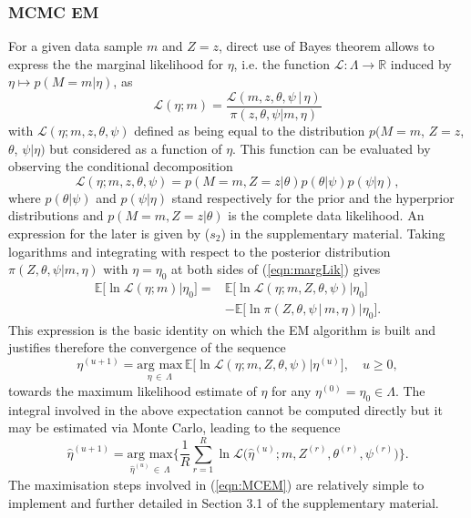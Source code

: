 \documentclass{bioinfo}
\begin{document}
\subsubsection{MCMC EM}\label{sec:MCMCEM}
For a given data sample $m$ and $Z = z$, direct use of Bayes theorem 
allows to  express the the marginal likelihood for $\eta$, i.e. the
function $\mathcal L: \Lambda \to \mathbb R$ induced by $\eta 
\mapsto p(M=m|\eta)$, as
\begin{equation}
  \label{eqn:margLik}
  \mathcal L(\eta; m) 
  = \frac{\mathcal L(m, z, \theta, \psi\,|\,\eta)}{\pi(z,
      \theta, \psi|m, \eta)}
\end{equation}
with $\mathcal L(\eta; m, z, \theta, \psi)$ 
defined as being equal to the distribution $p(M=m$, $Z=z$, $\theta$,
$\psi|\eta)$ but considered as a function of $\eta$.  This function
can be evaluated by observing the conditional decomposition
\[
   \mathcal L(\eta; m, z, \theta, \psi) 
  = 
   p(M=m, Z=z|\theta) p(\theta|\psi)p(\psi|\eta), 
\]
where $p(\theta|\psi)$ and $p(\psi|\eta)$ stand respectively for the
prior and the hyperprior distributions and $p(M=m, Z=z|\theta)$
is the complete data likelihood. An expression for the later is given
by ($s_2$) in the supplementary material. Taking logarithms and
integrating with respect to the posterior distribution $\pi(Z, \theta,
\psi|m, \eta)$ with $\eta = \eta_0$ at both sides of
(\ref{eqn:margLik}) gives 
\begin{align*}
   \mathbb E\big[\ln\mathcal L(\eta; m) \big| \eta_0\big] 
  =& 
  \mathbb E\big[\ln\mathcal L(\eta; m, Z, \theta, \psi)
    \big|  \eta_0\big]\\ 
  &-
  \mathbb E\big[\ln \pi(Z, \theta, \psi\,|\,m,\eta)\big| \eta_0\big].
\end{align*}  
This expression is the basic identity on which the EM algorithm is
built and justifies therefore the convergence of the sequence
\begin{equation}
 \label{eqn:EofMCEM}
  \eta^{(u+1)} = \underset{\eta\,\in\, \Lambda}{\text{arg max}}\, 
  \mathbb E\Big[\ln\mathcal L(\eta; m, Z, \theta, \psi)\big|
  \eta^{(u)}\Big], 
  \quad u\geqslant 0,
\end{equation}
towards the maximum likelihood estimate of $\eta$ for any $\eta^{(0)}
= \eta_0  \in \Lambda$. The integral involved in the above expectation
cannot be computed directly but it may be estimated via Monte Carlo,
leading to the sequence 
\begin{equation}
 \label{eqn:MCEM}
   \hat\eta^{(u+1)}
 = 
    \underset{\hat\eta^{(u)}\,\in\,\Lambda}{\text{arg max}} 
   \bigg\{
    \frac{1}{R}\sum_{r=1}^R 
      \ln\mathcal L\Big(\hat\eta^{(u)}; m, Z^{(r)}, \theta^{(r)},
      \psi^{(r)}\Big)
   \bigg\}.
\end{equation}
The maximisation steps involved in (\ref{eqn:MCEM}) are relatively
simple to implement and further detailed in Section 3.1 of the
supplementary material.
\end{document}
